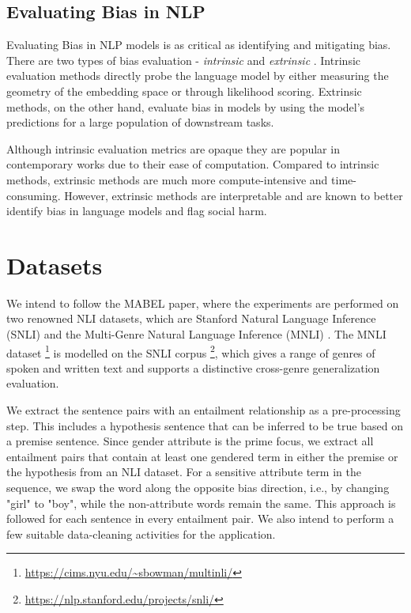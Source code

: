 \documentclass[11pt]{article}
\begin{document}
\subsection{Evaluating Bias in NLP}

Evaluating Bias in NLP models is as critical as identifying and mitigating bias. There are two types of bias evaluation - \textit{intrinsic} and \textit{extrinsic} \cite{he2022mabel}. Intrinsic evaluation methods directly probe the language model by either measuring the geometry of the embedding space or through likelihood scoring. Extrinsic methods, on the other hand, evaluate bias in models by using the model's predictions for a large population of downstream tasks. 

Although intrinsic evaluation metrics are opaque they are popular in contemporary works due to their ease of computation. Compared to intrinsic methods, extrinsic methods are much more compute-intensive and time-consuming. However, extrinsic methods are interpretable and are known to better identify bias in language models and flag social harm. 

\section{Datasets}

We intend to follow the MABEL paper, where the experiments are performed on two renowned NLI datasets, which are Stanford Natural Language Inference (SNLI) \cite{SNLI_dataset_paper} and the Multi-Genre Natural Language Inference (MNLI) \cite{MNLI_dataset_paper}. The MNLI dataset \footnote{\url{https://cims.nyu.edu/~sbowman/multinli/}} is modelled on the SNLI corpus \footnote{\url{https://nlp.stanford.edu/projects/snli/}}, which gives a range of genres of spoken and written text and supports a distinctive cross-genre generalization evaluation. 

We extract the sentence pairs with an entailment relationship as a pre-processing step. This includes a hypothesis sentence that can be inferred to be true based on a premise sentence. Since gender attribute is the prime focus, we extract all entailment pairs that contain at least one gendered term in either the premise or the hypothesis from an NLI dataset. For a sensitive attribute term in the sequence, we swap the word along the opposite bias direction, i.e., by changing "girl" to "boy", while the non-attribute words remain the same. This approach is followed for each sentence in every entailment pair. We also intend to perform a few suitable data-cleaning activities for the application.
\end{document}
